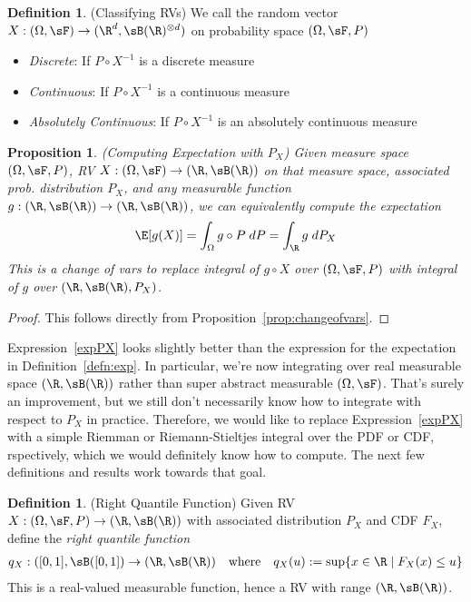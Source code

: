 \documentclass[12pt]{article}
\theoremstyle{plain}
\newtheorem{prop}[thm]{Proposition}
\theoremstyle{definition}
\newtheorem{defn}[thm]{Definition}
\theoremstyle{remark}
\newcommand{\ra}{\rightarrow}
\begin{document}
\begin{defn}(Classifying RVs)
We call the random vector $X:(\Omega,\sF)\ra(\R^d,\sB(\R)^{\otimes d})$
on probability space $(\Omega,\sF,P)$
\begin{itemize}
  \item \emph{Discrete}: If $P\circ X^{-1}$ is a discrete measure
  \item \emph{Continuous}: If $P\circ X^{-1}$ is a continuous measure
  \item \emph{Absolutely Continuous}: If $P\circ X^{-1}$ is an
    absolutely continuous measure
\end{itemize}
\end{defn}

\begin{prop}\emph{(Computing Expectation with $P_X$)}
\label{prop:expPX}
Given measure space $(\Omega,\sF,P)$, RV
$X:(\Omega,\sF)\ra (\R,\sB(\R))$  on that measure space, associated
prob. distribution $P_X$, and any measurable function
$g:(\R,\sB(\R))\ra(\R,\sB(\R))$, we can equivalently compute the
expectation
\begin{align}
  \E[g(X)]
  = \int_\Omega g \circ P \;dP
  = \int_\R g \;dP_X
  \label{expPX}
\end{align}
This is a change of vars to replace integral of $g\circ X$ over
$(\Omega,\sF,P)$ with integral of $g$ over $(\R,\sB(\R),P_X)$.
\end{prop}
\begin{proof}
This follows directly from Proposition~\ref{prop:changeofvars}.
\end{proof}

Expression~\ref{expPX} looks slightly better than the expression for the
expectation in Definition~\ref{defn:exp}. In particular, we're now
integrating over real measurable space $(\R,\sB(\R))$ rather than super
abstract measurable $(\Omega,\sF)$. That's surely an improvement, but
we still don't necessarily know how to integrate with respect to $P_X$
in practice. Therefore, we would like to replace Expression~\ref{expPX}
with a simple Riemman or Riemann-Stieltjes integral over the PDF or CDF,
rspectively, which we would definitely know how to compute.
The next few definitions and results work towards that goal.

\begin{defn}(Right Quantile Function)
Given RV $X:(\Omega,\sF,P)\ra(\R,\sB(\R))$
with associated distribution $P_X$ and CDF $F_X$,
define the \emph{right quantile function}
\begin{align*}
  q_X:([0,1],\sB([0,1])\ra(\R,\sB(\R))
  \quad\text{where}\quad
  q_X(u) := \sup\{x\in\R\;|\; F_X(x)\leq u\}
\end{align*}
This is a real-valued measurable function, hence a RV with range
$(\R,\sB(\R))$.
\end{defn}
\end{document}

